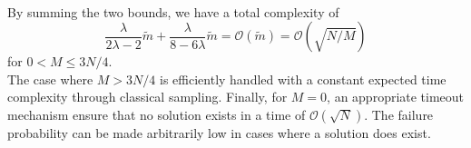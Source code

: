 \\[5pt]
By summing the two bounds, we have a total complexity of
\[\frac{\lambda}{2\lambda-2}\tilde{m} + \frac{\lambda}{8-6\lambda}\tilde{m} = \mathcal{O}(\tilde{m}) = \mathcal{O}(\sqrt{N/M})\] for $0<M \leq 3N/4$.
\\[5pt]
The case where $M > 3N/4$ is efficiently handled with a constant expected time complexity through classical sampling. Finally, for $M = 0$, an appropriate timeout mechanism ensure that no solution exists in a time of $\mathcal{O}(\sqrt{N})$. The failure probability can be made arbitrarily low in cases where a solution does exist. 